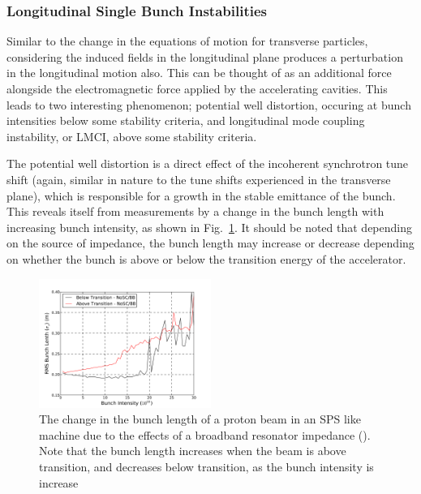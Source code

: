 \subsubsection{Longitudinal Single Bunch Instabilities}

Similar to the change in the equations of motion for transverse particles, considering the induced fields in the longitudinal plane produces a perturbation in the longitudinal motion also. This can be thought of as an additional force alongside the electromagnetic force applied by the accelerating cavities. This leads to two interesting phenomenon; potential well distortion, occuring at bunch intensities below some stability criteria, and longitudinal mode coupling instability, or LMCI, above some stability criteria.

The potential well distortion is a direct effect of the incoherent synchrotron tune shift (again, similar in nature to the tune shifts experienced in the transverse plane), which is responsible for a growth in the stable emittance of the bunch. This reveals itself from measurements by a change in the bunch length with increasing bunch intensity, as shown in Fig.~\ref{fig:pot_well_dist}. It should be noted that depending on the source of impedance, the bunch length may increase or decrease depending on whether the bunch is above or below the transition energy of the accelerator.

\begin{figure}
\begin{center}
\includegraphics[width=0.5\textwidth]{Wakefields_and_Impedances/figures/rms_bunch_length_AT_BT_BB.pdf}
\end{center}
\caption{The change in the bunch length of a proton beam in an SPS like machine due to the effects of a broadband resonator impedance (). Note that the bunch length increases when the beam is above transition, and decreases below transition, as the bunch intensity is increase}
\label{fig:pot_well_dist}
\end{figure}

